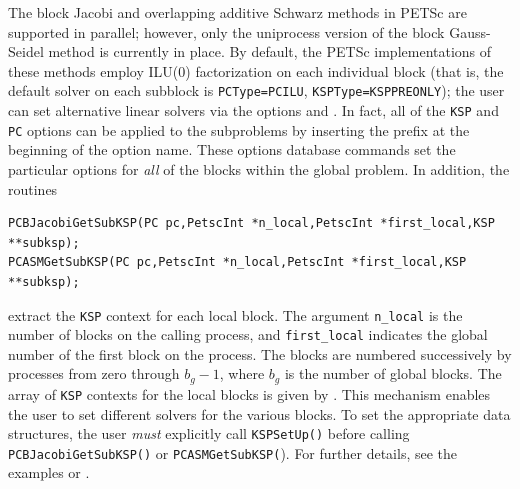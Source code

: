  
  
The block Jacobi and overlapping additive Schwarz methods in PETSc are
supported in parallel; however, only the uniprocess
version of the block Gauss-Seidel method is currently in place.
By default, the PETSc implementations of these methods
employ ILU(0) factorization on each individual block (that is, the default solver on each
subblock is \lstinline{PCType=PCILU}, \lstinline{KSPType=KSPPREONLY});
the user can set alternative linear solvers via the options
 
 and . In fact, all of the \lstinline{KSP}
and \lstinline{PC} options can be applied to the subproblems by inserting the prefix
 at the beginning of the option name. 
These options database commands set the particular options for {\em all}
of the blocks within the global problem.  In addition, the routines
\begin{lstlisting}
PCBJacobiGetSubKSP(PC pc,PetscInt *n_local,PetscInt *first_local,KSP **subksp);
PCASMGetSubKSP(PC pc,PetscInt *n_local,PetscInt *first_local,KSP **subksp);
\end{lstlisting}
extract the \lstinline{KSP} context for each local
block.  The argument \lstinline{n_local} is the number of blocks on the
calling process, and \lstinline{first_local} indicates the global number
of the first block on the process. The blocks are numbered
successively by processes from zero through $b_g-1$,
where $b_g$ is the number of global blocks.
The array of \lstinline{KSP} contexts for the local blocks is given by .
This mechanism enables the user to set different solvers for the
various blocks.  To set the appropriate data structures, the
user {\em must} explicitly call \lstinline{KSPSetUp()}
before calling \lstinline{PCBJacobiGetSubKSP()} or
\lstinline{PCASMGetSubKSP(}).
For further details, see the
examples \href{https://www.mcs.anl.gov/petsc/petsc-current/src/ksp/ksp/tutorials/ex7.c.html}{}
or \href{https://www.mcs.anl.gov/petsc/petsc-current/src/ksp/ksp/tutorials/ex7.c.html}{}.


